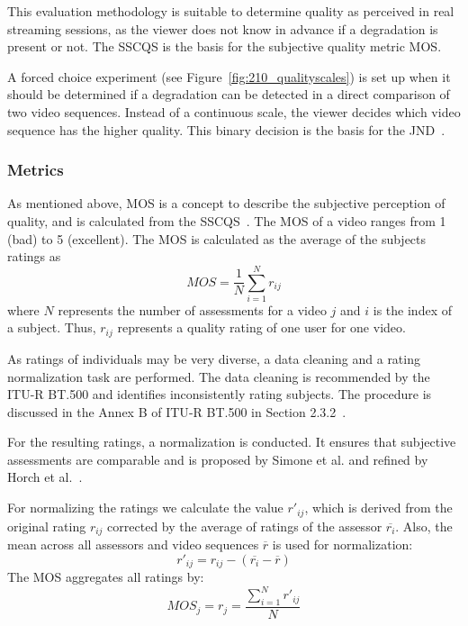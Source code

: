This evaluation methodology is suitable to determine quality as perceived in real streaming sessions, as the viewer does not know in advance if a degradation is present or not.
The \ac{SSCQS} is the basis for the subjective quality metric \ac{MOS}.

A forced choice experiment (see Figure~\ref{fig:210_qualityscales}) is set up when it should be determined if a degradation can be detected in a direct comparison of two video sequences.
Instead of a continuous scale, the viewer decides which video sequence has the higher quality.
This binary decision is the basis for the \ac{JND}~\cite{Keelan2003}.
\subsubsection{Metrics}
As mentioned above, \ac{MOS} is a concept to describe the subjective perception of quality, and is calculated from the \ac{SSCQS}~\cite{Suarez2016}. 
The \ac{MOS} of a video ranges from 1 (bad) to 5 (excellent).
The \ac{MOS} is calculated as the average of the subjects ratings as
\begin{equation}
	MOS = \frac{1}{N}\sum_{i=1}^{N}r_{ij}
\end{equation}
where $N$ represents the number of assessments for a video $j$ and $i$ is the index of a subject. 
Thus, $r_{ij}$ represents a quality rating of one user for one video.

As ratings of individuals may be very diverse, a data cleaning and a rating normalization task are performed.
The data cleaning is recommended by the \ac{ITU}-R BT.500 and identifies inconsistently rating subjects. 
The procedure is discussed in the Annex B of \ac{ITU}-R BT.500 in Section 2.3.2~\cite{ITU-R2012}.

For the resulting ratings, a normalization is conducted. 
It ensures that subjective assessments are comparable and is proposed by Simone et al. and refined by Horch et al.~\cite{DeSimone2010,qualitycrowd}. 

For normalizing the ratings we calculate the value $r'_{ij}$, which is derived from the original rating $r_{ij}$ corrected by the average of ratings of the assessor $\overline{r_i}$.
Also, the mean across all assessors and video sequences $\overline{r}$ is used for normalization:
\begin{equation}
r'_{ij} = r_{ij} - (\overline{r_i} - \overline{r}) 
\end{equation}
The \ac{MOS} aggregates all ratings by:
\begin{equation}
MOS_{j} = r_{j} =  \frac{\sum_{i=1}^{N} r'_{ij}}{N}
\end{equation}

